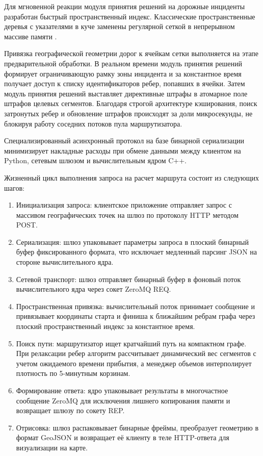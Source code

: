 Для мгновенной реакции модуля принятия решений на дорожные инциденты разработан быстрый пространственный индекс. Классические пространственные деревья с указателями в куче заменены регулярной сеткой в непрерывном массиве памяти \cite{drepper2007memory}. 

Привязка географической геометрии дорог к ячейкам сетки выполняется на этапе предварительной обработки. В реальном времени модуль принятия решений формирует ограничивающую рамку зоны инцидента и за константное время получает доступ к списку идентификаторов ребер, попавших в ячейки. Затем модуль принятия решений выставляет директивные штрафы в атомарное поле штрафов целевых сегментов. Благодаря строгой архитектуре кэширования, поиск затронутых ребер и обновление штрафов происходят за доли микросекунды, не блокируя работу соседних потоков пула маршрутизатора.

Специализированный асинхронный протокол на базе бинарной сериализации минимизирует накладные расходы при обмене данными между клиентом на Python, сетевым шлюзом и вычислительным ядром C++. 

Жизненный цикл выполнения запроса на расчет маршрута состоит из следующих шагов:
\begin{enumerate}
    \item Инициализация запроса: клиентское приложение отправляет запрос с массивом географических точек на шлюз по протоколу HTTP методом POST.
    \item Сериализация: шлюз упаковывает параметры запроса в плоский бинарный буфер фиксированного формата, что исключает медленный парсинг JSON на стороне вычислительного ядра.
    \item Сетевой транспорт: шлюз отправляет бинарный буфер в фоновый поток вычислительного ядра через сокет ZeroMQ REQ.
    \item Пространственная привязка: вычислительный поток принимает сообщение и привязывает координаты старта и финиша к ближайшим ребрам графа через плоский пространственный индекс за константное время.
    \item Поиск пути: маршрутизатор ищет кратчайший путь на компактном графе. При релаксации ребер алгоритм рассчитывает динамический вес сегментов с учетом ожидаемого времени прибытия, а менеджер объемов интерполирует плотность по 5-минутным корзинам.
    \item Формирование ответа: ядро упаковывает результаты в многочастное сообщение ZeroMQ для исключения лишнего копирования памяти и возвращает шлюзу по сокету REP.
    \item Отрисовка: шлюз распаковывает бинарные фреймы, преобразует геометрию в формат GeoJSON и возвращает её клиенту в теле HTTP-ответа для визуализации на карте.


\end{enumerate}

